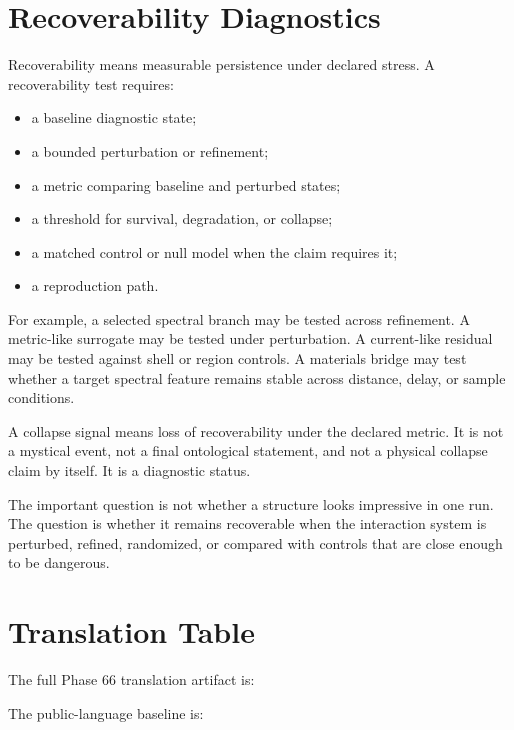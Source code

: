 \documentclass[11pt]{article}
\begin{document}
\section{Recoverability Diagnostics}

Recoverability means measurable persistence under declared stress. A recoverability test requires:

\begin{itemize}
\item a baseline diagnostic state;
\item a bounded perturbation or refinement;
\item a metric comparing baseline and perturbed states;
\item a threshold for survival, degradation, or collapse;
\item a matched control or null model when the claim requires it;
\item a reproduction path.
\end{itemize}

For example, a selected spectral branch may be tested across refinement. A metric-like surrogate may be tested under perturbation. A current-like residual may be tested against shell or region controls. A materials bridge may test whether a target spectral feature remains stable across distance, delay, or sample conditions.

A collapse signal means loss of recoverability under the declared metric. It is not a mystical event, not a final ontological statement, and not a physical collapse claim by itself. It is a diagnostic status.

The important question is not whether a structure looks impressive in one run. The question is whether it remains recoverable when the interaction system is perturbed, refined, randomized, or compared with controls that are close enough to be dangerous.

\section{Translation Table}

The full Phase 66 translation artifact is:

\begin{quote}
\end{quote}

The public-language baseline is:
\end{document}
